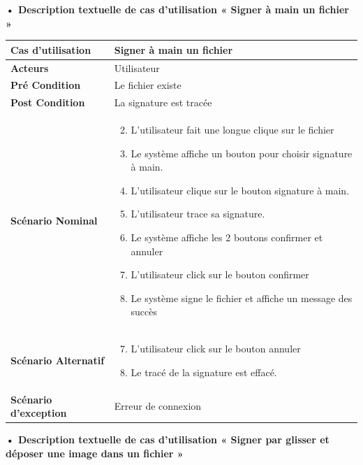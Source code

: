\textbf{•	Description textuelle de cas d'utilisation « Signer à main un fichier »}

\begin{longtable}{|p{5cm}|p{10cm}|}
\hline
\textbf{Cas d'utilisation}&Signer à main un fichier\\
\hline
\textbf{Acteurs}&Utilisateur\\
\hline
\textbf{Pré Condition}&Le fichier existe\\
\hline
\textbf{Post Condition}&La signature est tracée\\
\hline
\textbf{Scénario Nominal}&
\vspace{-\baselineskip}
\begin{enumerate}
    \setcounter{enumi}{1}
  \item L'utilisateur fait une longue clique sur le fichier
  \item Le système affiche un bouton pour choisir signature à main. 
  \item L'utilisateur clique sur le bouton signature à main.
  \item L'utilisateur trace sa signature.
  \item Le système affiche les 2 boutons confirmer et annuler
  \item L'utilisateur click sur le bouton confirmer
  \item Le système signe le fichier et affiche un message des succès
\end{enumerate}\\
\hline
\textbf{Scénario Alternatif}&
\vspace{-\baselineskip}
\begin{enumerate}
    \setcounter{enumi}{6}
    \item L'utilisateur click sur le bouton annuler
    \item Le tracé de la signature est effacé.
\end{enumerate}\\
\hline
\textbf{Scénario d'exception}&Erreur de connexion\\
\hline
\end{longtable}

\textbf{•	Description textuelle de cas d'utilisation « Signer par glisser et déposer une image dans un fichier »}

